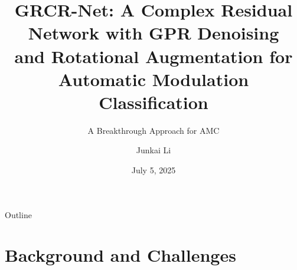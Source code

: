 \documentclass[aspectratio=169]{beamer}
\title[GRCR-Net]{GRCR-Net: A Complex Residual Network with GPR Denoising\\and Rotational Augmentation for Automatic Modulation Classification\\[0.3cm]}
\subtitle{A Breakthrough Approach for AMC}
\author[Junkai Li]{Junkai Li}
\institute[ZJUT]{College of Information Engineering\\Zhejiang University of Technology}
\date{July 5, 2025}
\begin{document}
\begin{frame}
    \titlepage
\end{frame}

\begin{frame}{Outline}
\tableofcontents
\end{frame}

\section{Background and Challenges}
\end{document}

